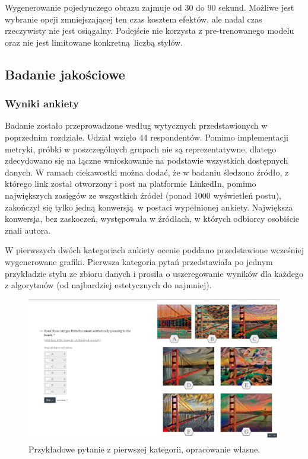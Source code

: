 \documentclass[12pt]{article}
\begin{document}
Wygenerowanie pojedynczego obrazu zajmuje od 30 do 90 sekund. Możliwe jest wybranie opcji zmniejszającej ten czas kosztem efektów, ale nadal czas rzeczywisty nie jest osiągalny. Podejście nie korzysta z pre-trenowanego modelu oraz nie jest limitowane konkretną liczbą stylów.

\subsection{Badanie jakościowe}

\subsubsection{Wyniki ankiety}
\indent

Badanie zostało przeprowadzone według wytycznych przedstawionych w poprzednim rozdziale. Udział wzięło 44 respondentów. Pomimo implementacji metryki, próbki w poszczególnych grupach nie są reprezentatywne, dlatego zdecydowano się na łączne wnioskowanie na podstawie wszystkich dostępnych danych. W ramach ciekawostki można dodać, że w badaniu śledzono źródło, z którego link został otworzony i post na platformie LinkedIn, pomimo największych zasięgów ze wszystkich źródeł (ponad 1000 wyświetleń postu), zakończył się tylko jedną konwersją w postaci wypełnionej ankiety. Największa konwersja, bez zaskoczeń, występowała w źródłach, w których odbiorcy osobiście znali autora.

W pierwszych dwóch kategoriach ankiety ocenie poddano przedstawione wcześniej wygenerowane grafiki. Pierwsza kategoria pytań przedstawiała po jednym przykładzie stylu ze zbioru danych i prosiła o uszeregowanie wyników dla każdego z algorytmów (od najbardziej estetycznych do najmniej).

\begin{figure}[H]
    \centering
    \includegraphics[width=\textwidth]{p1}
    \caption{Przykładowe pytanie z pierwszej kategorii, opracowanie własne.}
    \label{fig:19}
\end{figure}
\end{document}
